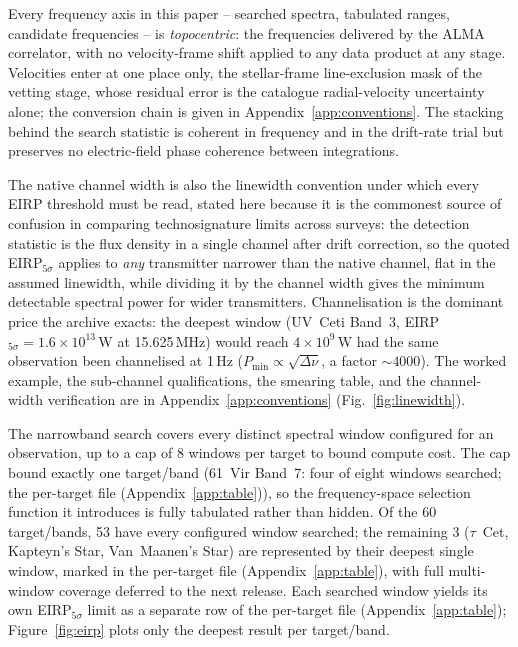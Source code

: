 \documentclass{openjournal}
\begin{document}
Every frequency axis in this paper -- searched spectra, tabulated
ranges, candidate frequencies -- is \emph{topocentric}: the
frequencies delivered by the ALMA correlator, with no velocity-frame
shift applied to any data product at any stage. Velocities enter at
one place only, the stellar-frame line-exclusion mask of the vetting
stage, whose residual error is the catalogue radial-velocity
uncertainty alone; the conversion chain is given in
Appendix~\ref{app:conventions}. The stacking behind the search
statistic is coherent in frequency and in the drift-rate trial but
preserves no electric-field phase coherence between integrations.

The native channel width is also the linewidth convention under which
every EIRP threshold must be read, stated here because it is the
commonest source of confusion in comparing technosignature limits
across surveys: the detection statistic is the flux density in a
single channel after drift correction, so the quoted EIRP$_{5\sigma}$
applies to \emph{any} transmitter narrower than the native channel,
flat in the assumed linewidth, while dividing it by the channel width
gives the minimum detectable spectral power for wider transmitters.
Channelisation is the dominant price the archive exacts: the deepest
window (UV~Ceti Band~3, EIRP$_{5\sigma}=1.6\times10^{13}$\,W at
15.625\,MHz) would reach $4\times10^{9}$\,W had the same observation
been channelised at 1\,Hz ($P_{\min}\propto\sqrt{\Delta\nu}$, a factor
${\sim}4000$). The worked example, the sub-channel qualifications, the
smearing table, and the channel-width verification are in
Appendix~\ref{app:conventions} (Fig.~\ref{fig:linewidth}).

The narrowband search covers every distinct spectral window
configured for an observation, up to a cap of 8 windows per target to
bound compute cost. The cap bound exactly one target/band (61~Vir
Band~7: four of eight windows searched; the per-target file (Appendix~\ref{app:table})), so the
frequency-space selection function it introduces is fully tabulated
rather than hidden. Of the 60 target/bands, 53 have every configured
window searched; the remaining 3 ($\tau$~Cet, Kapteyn's Star,
Van~Maanen's Star) are represented by their deepest single window,
marked in the per-target file (Appendix~\ref{app:table}), with full multi-window coverage
deferred to the next release. Each searched window yields its own
EIRP$_{5\sigma}$ limit as a separate row of the per-target file (Appendix~\ref{app:table});
Figure~\ref{fig:eirp} plots only the deepest result per target/band.
\end{document}
